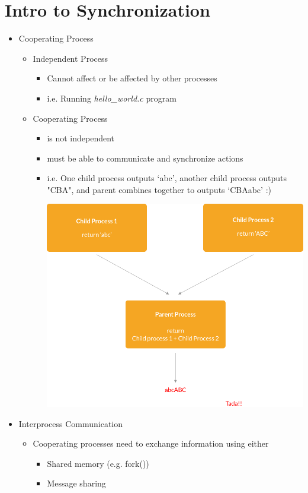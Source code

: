 \documentclass[12pt]{article}
\begin{document}
\bigskip

\section{Intro to Synchronization}

\bigskip

\begin{itemize}
    \item Cooperating Process
    \begin{itemize}
        \item Independent Process
        \begin{itemize}
            \item Cannot affect or be affected by other processes
            \item i.e. Running \textit{hello\_world.c} program
        \end{itemize}
        \item Cooperating Process
        \begin{itemize}
            \item is not independent
            \item must be able to communicate and synchronize actions
            \item i.e. One child process outputs `abc', another child process outputs "CBA",
            and parent combines together to outputs `CBAabc' :)

            \begin{center}
            \includegraphics[width=0.8\linewidth]{images/week_2_notes_2_1.png}
            \end{center}

        \end{itemize}
    \end{itemize}
    \item Interprocess Communication
    \begin{itemize}
        \item Cooperating processes need to exchange information using
        either
        \begin{itemize}
            \item Shared memory (e.g. fork())
            \item Message sharing
        \end{itemize}


\end{itemize}
\end{itemize}
\end{document}

